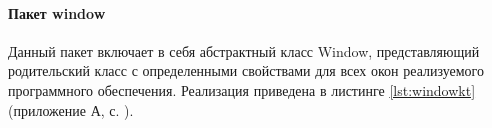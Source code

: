 
\paragraph{Пакет window \newline}
Данный пакет включает в себя абстрактный класс Window, представляющий родительский класс с определенными свойствами для всех окон реализуемого программного обеспечения. Реализация приведена в листинге \ref{lst:windowkt} (приложение А, с. \pageref{chp:application-a}).

